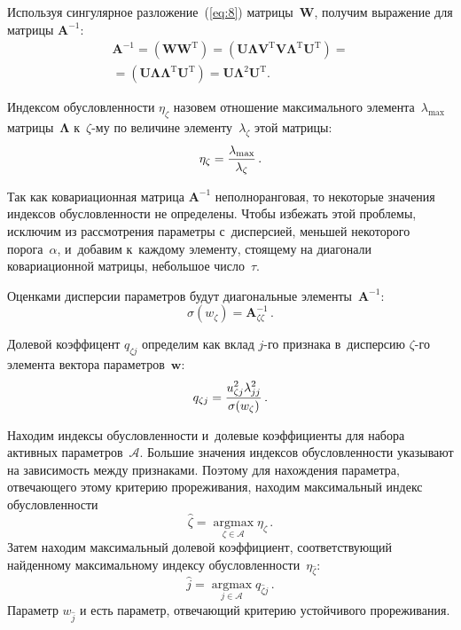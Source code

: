\begin{multicols}{2}
Используя сингулярное разложение~(\ref{eq:8}) матрицы~$\mathbf{W}$,
получим выражение для матрицы $\mathbf{A}^{-1}$:
\begin{multline*}
\mathbf{A}^{-1} = (\mathbf{W}\mathbf{W}^{\mathrm{T}}) =
(\mathbf{U}\mathbf{\Lambda}\mathbf{V}^{\mathrm{T}}\mathbf{V}\mathbf{\Lambda}^{\mathrm{T}}
\mathbf{U}^{\mathrm{T}}) = {}\\
{}=(\mathbf{U}\mathbf{\Lambda}\mathbf{\Lambda}^{\mathrm{T}}\mathbf{U}^{\mathrm{T}}) =
\mathbf{U}\mathbf{\Lambda}^{2}\mathbf{U}^{\mathrm{T}}.
\end{multline*}

Индексом обусловленности $\eta_{\zeta}$ назовем отношение
максимального элемента~$\lambda_{\max}$ матрицы~$\mathbf{\Lambda}$
к~${\zeta}$-му по величине элементу~$\lambda_{\zeta}$ этой матрицы:
\begin{equation*}
\eta_{\zeta} = \displaystyle\frac{\displaystyle \lambda_{\max}\mathstrut}{\displaystyle \lambda_{\zeta}\mathstrut}\,.
\end{equation*}

Так как ковариационная матрица $\mathbf{A}^{-1}$
неполноранговая, то некоторые значения индексов обу\-слов\-лен\-ности не определены.
Чтобы избежать этой проблемы, исключим из рассмотрения параметры с~дисперсией,
меньшей некоторого порога~$\alpha$, и~добавим к~каж\-до\-му элементу, стоящему
на диагонали ковариационной матрицы, небольшое число~$\tau$.

Оценками дисперсии параметров будут диагональные элементы~$\mathbf{A}^{-1}$:
\begin{equation*}
\sigma(w_{\zeta}) = \mathbf{A}^{-1}_{\zeta \zeta}\,.
\end{equation*}

Долевой коэффицент $q_{{\zeta}j}$ определим как вклад $j$-го признака
в~дисперсию ${\zeta}$-го элемента вектора параметров~$\mathbf{w}$:
\begin{equation*}
q_{{\zeta}j} = \displaystyle\frac{\displaystyle u_{{\zeta}j}^2\lambda_{jj}^2\mathstrut}{\displaystyle \sigma(w_{\zeta})\mathstrut}\,.
\end{equation*}

Находим индексы обусловленности и~долевые коэффициенты для набора
активных параметров~$\mathcal{A}$. Большие значения индексов обусловленности
указывают на зависимость между признаками. Поэтому для нахождения параметра,
отвечающего этому критерию прореживания, находим максимальный индекс
обусловленности
\begin{equation*}
\hat{{\zeta}} = \mathop{\text{argmax}}\limits_{{{\zeta} \in
\mathcal{A}}}\eta_{\zeta}\,.
\end{equation*}
Затем находим максимальный долевой коэффициент, соответствующий
найденному максимальному индексу обусловленности~$\eta_{\hat{{\zeta}}}$:
\begin{equation}
\label{eq:9}
\hat{j} = \mathop{\text{argmax}}\limits_{{j \in \mathcal{A}}}q_{\hat{{\zeta}}j}\,.
\end{equation}
Параметр $w_{\hat{j}}$ и есть параметр, отвечающий критерию устойчивого
прореживания.


\end{multicols}
